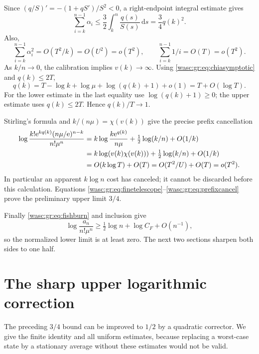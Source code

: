 \documentclass[11pt,a4paper]{article}
\theoremstyle{remark}\newtheorem{remark}[theorem]{Remark}
\newcommand{\dd}{\,\mathrm d}\newcommand{\ee}{\mathrm e}\newcommand{\Wc}{\mathcal W}
\numberwithin{equation}{section}
\begin{document}
Since $(q/S)'=-(1+qS')/S^2<0$, a right-endpoint integral estimate gives
\begin{equation}\label{wasc:gr:eq:mainaccumulation}
\sum_{i=k}^{n-1}\alpha_i
\le\frac32\int_k^n\frac{q(s)}{S(s)}\dd s
=\frac34q(k)^2.
\end{equation}
Also,
\begin{equation}\label{wasc:gr:eq:smallerrors}
\sum_{i=k}^{n-1}\alpha_i^2=O(T^2/k)=O(U^2)=o(T^2),
\qquad \sum_{i=k}^{n-1}1/i=O(T)=o(T^2).
\end{equation}
As $k/n\to0$, the calibration implies $v(k)\to\infty$. Using \eqref{wasc:gr:eq:chiasymptotic} and $q(k)\le2T$,
\[
q(k)=T-\log k+\log\mu+\log(q(k)+1)+o(1)=T+O(\log T).
\]
For the lower estimate in the last equality use $\log(q(k)+1)\ge0$; the upper estimate uses $q(k)\le2T$. Hence $q(k)/T\to1$.

Stirling's formula and $k/(n\mu)=\chi(v(k))$ give the precise prefix cancellation
\begin{align}\label{wasc:gr:eq:prefixcancel}
\log\frac{k!\ee^{kq(k)}(n\mu/\ee)^{n-k}}{n!\mu^n}
&=k\log\frac{k\ee^{q(k)}}{n\mu}+\tfrac12\log(k/n)+O(1/k)\notag\\
&=k\log(v(k)\chi(v(k)))+\tfrac12\log(k/n)+O(1/k)\notag\\
&=O(k\log T)+O(T)=O(T^2/U)+O(T)=o(T^2).
\end{align}
In particular an apparent $k\log n$ cost has canceled; it cannot be discarded before this calculation. Equations \eqref{wasc:gr:eq:finetelescope}--\eqref{wasc:gr:eq:prefixcancel} prove the preliminary upper limit $3/4$.

Finally \eqref{wasc:gr:eq:fishburn} and inclusion give
\[
\log\frac{a_n}{n!\mu^n}\ge\tfrac12\log n+\log C_F+O(n^{-1}),
\]
so the normalized lower limit is at least zero. The next two sections sharpen both sides to one half.

\section{The sharp upper logarithmic correction}\label{wasc:gr:sec:sharpupper}
The preceding $3/4$ bound can be improved to $1/2$ by a quadratic corrector. We give the finite identity and all uniform estimates, because replacing a worst-case state by a stationary average without these estimates would not be valid.
\end{document}

